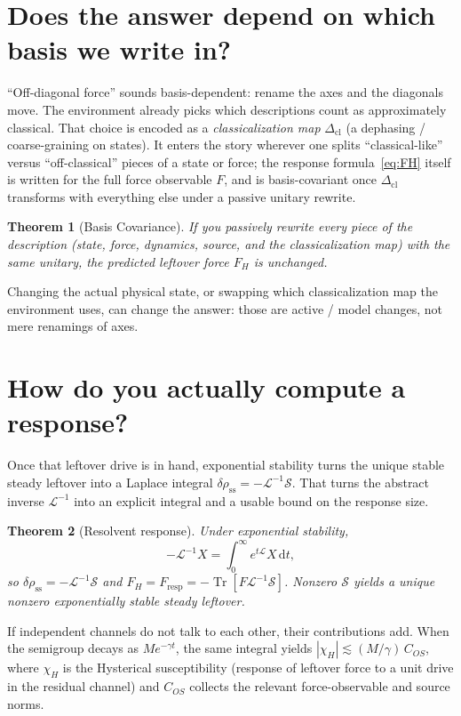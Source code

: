 \documentclass[11pt]{article}
\newtheorem{theorem}{Theorem}[section]
\theoremstyle{remark}
\newcommand{\Tr}{\operatorname{Tr}}
\newcommand{\dd}{\mathrm{d}}
\newcommand{\chiH}{\chi_{H}}
\begin{document}
\section{Does the answer depend on which basis we write in?}
``Off-diagonal force'' sounds basis-dependent: rename the axes and the diagonals move.
The environment already picks which descriptions count as approximately classical.
That choice is encoded as a \emph{classicalization map} $\Delta_{\mathrm{cl}}$ (a dephasing / coarse-graining on states).
It enters the story wherever one splits ``classical-like'' versus ``off-classical'' pieces of a state or force; the response formula~\eqref{eq:FH} itself is written for the full force observable $F$, and is basis-covariant once $\Delta_{\mathrm{cl}}$ transforms with everything else under a passive unitary rewrite.

\begin{theorem}[Basis Covariance]
If you passively rewrite every piece of the description (state, force, dynamics, source, and the classicalization map) with the same unitary, the predicted leftover force $F_H$ is unchanged.
\end{theorem}

Changing the actual physical state, or swapping which classicalization map the environment uses, can change the answer: those are active / model changes, not mere renamings of axes.

\section{How do you actually compute a response?}
Once that leftover drive is in hand, exponential stability turns the unique stable steady leftover into a Laplace integral $\delta\rho_{\mathrm{ss}}=-\mathcal L^{-1}\mathcal S$.
That turns the abstract inverse $\mathcal L^{-1}$ into an explicit integral and a usable bound on the response size.

\begin{theorem}[Resolvent response]
Under exponential stability,
\begin{equation}
  -\mathcal L^{-1}X=\int_0^\infty e^{t\mathcal L}X\,\dd t,
\end{equation}
so $\delta\rho_{\mathrm{ss}}=-\mathcal L^{-1}\mathcal S$ and $F_H=F_{\mathrm{resp}}=-\Tr[F\mathcal L^{-1}\mathcal S]$.
Nonzero $\mathcal S$ yields a unique nonzero exponentially stable steady leftover.
\end{theorem}

If independent channels do not talk to each other, their contributions add.
When the semigroup decays as $M e^{-\gamma t}$, the same integral yields $|\chiH|\lesssim (M/\gamma)\,C_{OS}$, where $\chiH$ is the Hysterical susceptibility (response of leftover force to a unit drive in the residual channel) and $C_{OS}$ collects the relevant force-observable and source norms.
\end{document}
